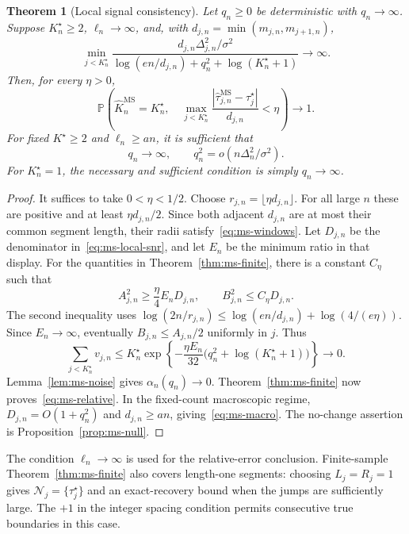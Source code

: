 \documentclass[pdflatex,sn-mathphys-num]{sn-jnl}
\newcommand{\Prob}{\mathbb P}
\newcommand{\taus}{\tau^\star}
\theoremstyle{thmstyleone}
\newtheorem{theorem}{Theorem}
\theoremstyle{thmstyletwo}
\begin{document}
\begin{theorem}[Local signal consistency]\label{thm:ms-consistency}
Let $q_n\ge0$ be deterministic with $q_n\to\infty$. Suppose $K_n^\star\ge2$,
$\ell_n\to\infty$, and, with $d_{j,n}=\min(m_{j,n},m_{j+1,n})$,
\begin{equation}\label{eq:ms-local-snr}
\min_{j<K_n^\star}
\frac{d_{j,n}\Delta_{j,n}^2/\sigma^2}
{\log(en/d_{j,n})+q_n^2+\log(K_n^\star+1)}\longrightarrow\infty.
\end{equation}
Then, for every $\eta>0$,
\begin{equation}\label{eq:ms-relative}
\Prob\left(\widehat K_n^{\mathrm{MS}}=K_n^\star,\quad
\max_{j<K_n^\star}
\frac{|\widehat\tau_{j,n}^{\mathrm{MS}}-\taus_j|}{d_{j,n}}<\eta\right)
\longrightarrow1.
\end{equation}
For fixed $K^\star\ge2$ and $\ell_n\ge an$, it is sufficient that
\begin{equation}\label{eq:ms-macro}
q_n\to\infty,\qquad q_n^2=o(n\Delta_n^2/\sigma^2).
\end{equation}
For $K_n^\star=1$, the necessary and sufficient condition is simply
$q_n\to\infty$.
\end{theorem}
\begin{proof}
It suffices to take $0<\eta<1/2$. Choose
$r_{j,n}=\lfloor\eta d_{j,n}\rfloor$. For all large $n$ these are positive
and at least $\eta d_{j,n}/2$. Since both adjacent $d_{j,n}$ are at most
their common segment length, their radii satisfy~\eqref{eq:ms-windows}.
Let $D_{j,n}$ be the denominator in~\eqref{eq:ms-local-snr}, and let
$E_n$ be the minimum ratio in that display. For the quantities in
Theorem~\ref{thm:ms-finite}, there is a constant $C_\eta$ such that
\[
A_{j,n}^2\ge\frac{\eta}{4}E_nD_{j,n},\qquad
B_{j,n}^2\le C_\eta D_{j,n}.
\]
The second inequality uses
$\log(2n/r_{j,n})\le\log(en/d_{j,n})+\log(4/(e\eta))$.
Since $E_n\to\infty$, eventually $B_{j,n}\le A_{j,n}/2$ uniformly in $j$.
Thus
\[
\sum_{j<K_n^\star}v_{j,n}
\le K_n^\star\exp\!\left\{-\frac{\eta E_n}{32}
\bigl(q_n^2+\log(K_n^\star+1)\bigr)\right\}\longrightarrow0.
\]
Lemma~\ref{lem:ms-noise} gives $\alpha_n(q_n)\to0$.
Theorem~\ref{thm:ms-finite} now proves~\eqref{eq:ms-relative}.
In the fixed-count macroscopic regime, $D_{j,n}=O(1+q_n^2)$ and
$d_{j,n}\ge an$, giving~\eqref{eq:ms-macro}. The no-change assertion is
Proposition~\ref{prop:ms-null}.
\end{proof}

The condition $\ell_n\to\infty$ is used for the relative-error conclusion.
Finite-sample Theorem~\ref{thm:ms-finite} also covers length-one segments:
choosing $L_j=R_j=1$ gives $\mathcal N_j=\{\taus_j\}$ and an exact-recovery
bound when the jumps are sufficiently large. The $+1$ in the integer
spacing condition permits consecutive true boundaries in this case.
\end{document}
